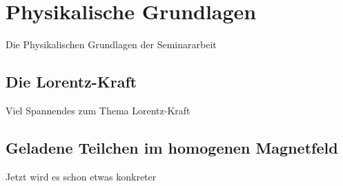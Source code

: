 \chapter{Physikalische Grundlagen}

Die Physikalischen Grundlagen der Seminararbeit

\section{Die Lorentz-Kraft}

Viel Spannendes zum Thema Lorentz-Kraft

\section{Geladene Teilchen im homogenen Magnetfeld}

Jetzt wird es schon etwas konkreter
